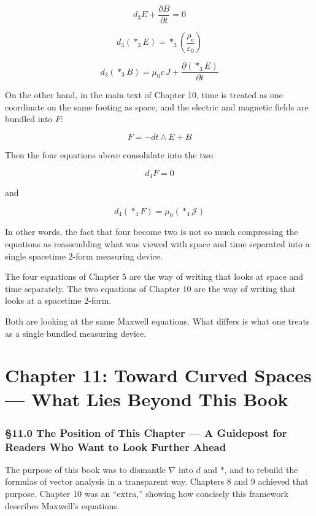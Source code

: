\documentclass[a4paper,12pt,openany]{book}
\begin{document}
\[
d_3E+\frac{\partial B}{\partial t}=0
\]

\[
d_3(\ast_3E)=\ast_3\left(\frac{\rho_{\mathrm e}}{\varepsilon_0}\right)
\]

\[
d_3(\ast_3B)=\mu_0 c\,J+\frac{\partial(\ast_3E)}{\partial t}
\]

On the other hand, in the main text of Chapter 10, time is treated as
one coordinate on the same footing as space, and the electric and
magnetic fields are bundled into \(F\):

\[
F=-dt\wedge E+B
\]

Then the four equations above consolidate into the two

\[
d_4F=0
\]

and

\[
d_4(\ast_4F)=\mu_0(\ast_4\mathcal J)
\]

In other words, the fact that four become two is not so much compressing
the equations as reassembling what was viewed with space and time
separated into a single spacetime \(2\)-form measuring device.

The four equations of Chapter 5 are the way of writing that looks at
space and time separately. The two equations of Chapter 10 are the way
of writing that looks at a spacetime \(2\)-form.

Both are looking at the same Maxwell equations. What differs is what one
treats as a single bundled measuring device.

\newpage

\hypertarget{chapter-11-toward-curved-spaces-what-lies-beyond-this-book}{%
\chapter{Chapter 11: Toward Curved Spaces — What Lies Beyond This
Book}\label{chapter-11-toward-curved-spaces-what-lies-beyond-this-book}}

\hypertarget{the-position-of-this-chapter-a-guidepost-for-readers-who-want-to-look-further-ahead}{%
\subsection{§11.0 The Position of This Chapter — A Guidepost for
Readers Who Want to Look Further
Ahead}\label{the-position-of-this-chapter-a-guidepost-for-readers-who-want-to-look-further-ahead}}

The purpose of this book was to dismantle \(\nabla\) into \(d\) and
\(\ast\), and to rebuild the formulas of vector analysis in a
transparent way. Chapters 8 and 9 achieved that purpose. Chapter 10 was
an ``extra,'' showing how concisely this framework describes Maxwell's
equations.
\end{document}
